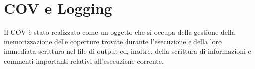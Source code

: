 \section{COV e Logging}
Il COV è stato realizzato come un oggetto che si occupa della gestione della memorizzazione delle coperture trovate durante l'esecuzione e della loro immediata scrittura nel file di output ed, inoltre, della scrittura di informazioni e commenti importanti relativi all'esecuzione corrente.